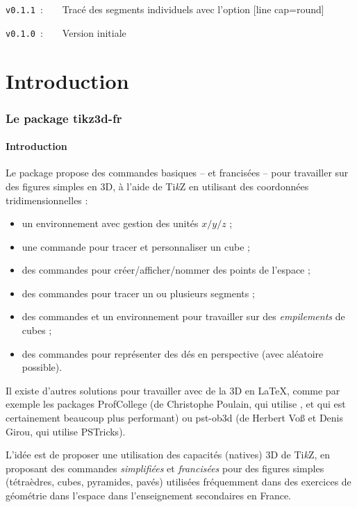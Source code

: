 \documentclass[french,a4paper,11pt]{article}
\providecommand\tikzlogo{Ti\textit{k}Z}
\providecommand\PSTricks{\textsf{PSTricks}\xspace}
\let\pstricks\PSTricks
\let\TikZ\tikzlogo
\begin{document}
\verb|v0.1.1|~:~~~~Tracé des segments individuels avec l'option \textsf{[line cap=round]}

\verb|v0.1.0|~:~~~~Version initiale

\pagebreak

\part{Introduction}

\section{Le package tikz3d-fr}

\subsection{Introduction}

\begin{noteblock}
Le package propose des commandes basiques -- et francisées -- pour travailler sur des figures simples en 3D, à l'aide de \TikZ{} en utilisant des coordonnées tridimensionnelles :

\begin{itemize}
	\item un environnement avec gestion des unités $x/y/z$ ;
	\item une commande pour tracer et personnaliser un cube ;
	\item des commandes pour créer/afficher/nommer des points de l'espace ;
	\item des commandes pour tracer un ou plusieurs segments ;
	\item des commandes et un environnement pour travailler sur des \textit{empilements} de cubes ;
	\item des commandes pour représenter des dés en perspective (avec aléatoire possible).
\end{itemize}
\vspace*{-\baselineskip}\leavevmode
\end{noteblock}

\begin{importantblock}
Il existe d'autres solutions pour travailler avec de la 3D en \LaTeX, comme par exemple les packages \textsf{ProfCollege}\footnotemark{} (de Christophe Poulain, qui utilise , et qui est certainement beaucoup plus performant) ou \textsf{pst-ob3d}\footnotemark{} (de Herbert Voß et Denis Girou, qui utilise \pstricks).

\smallskip

L'idée est de proposer une utilisation des capacités (natives) 3D de \TikZ, en proposant des commandes \textit{simplifiées} et \textit{francisées} pour des figures simples (tétraèdres, cubes, pyramides, pavés) utilisées fréquemment dans des exercices de géométrie dans l'espace dans l'enseignement secondaires en France.
\end{importantblock}
\end{document}
